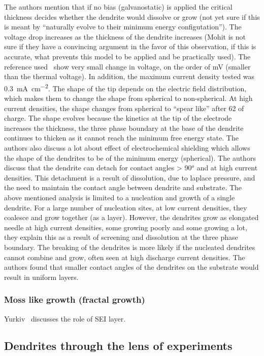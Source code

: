 \documentclass[12pt]{book}
\begin{document}
The authors mention that if no bias (galvanostatic) is applied the critical thickness decides whether the dendrite would dissolve or grow (not yet sure if this is meant by ``naturally evolve to their minimum energy configutation''). The voltage drop increases as the thickness of the dendrite increases (Mohit is not sure if they have a convincing argument in the favor of this observation, if this is accurate, what prevents this model to be applied and be practically used). The reference used~\cite{Rosso2001} show very small change in voltage, on the order of mV (smaller than the thermal voltage). In addition, the maximum current density tested was \SI{0.3}{\milli\ampere\per\centi\meter\squared}. 
The shape of the tip depends on the electric field distribution, which makes them to change the shape from spherical to non-spherical. At high current densities, the shape changes from spherical to ``spear like'' after \SI{62}{\min} of charge. The shape evolves because the kinetics at the tip of the electrode increases the thickness, the three phase boundary at the base of the dendrite continues to thicken as it cannot reach the minimum free energy state. The authors also discuss a lot about effect of electrochemical shielding which allows the shape of the dendrites to be of the minimum energy (spherical). The authors discuss that the dendrite can detach for contact angles > 90$^o$ and at high current densities. This detachment is a result of dissolution, due to laplace pressure, and the need to maintain the contact angle between dendrite and substrate. The above mentioned analysis is limited to a nucleation and growth of a single dendrite. 
For a large number of nucleation sites, at low current densities, they coalesce and grow together (as a layer). However, the dendrites grow as elongated needle at high current densities, some growing poorly and some growing a lot, they explain this as a result of screening and dissolution at the three phase boundary. The breaking of the dendrites is more likely if the nucleated dendrites cannot combine and grow, often seen at high discharge current densities. The authors found that smaller contact angles of the dendrites on the substrate would result in uniform layers.  

\subsubsection{Moss like growth (fractal growth)}
Yurkiv~\cite{Yurkiv2018} discusses the role of SEI layer. 
\subsection{Dendrites through the lens of experiments}
\end{document}
